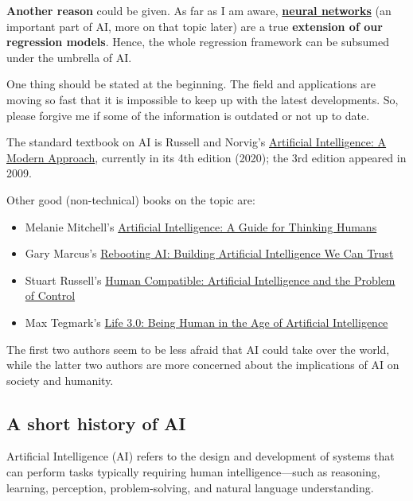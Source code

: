 \documentclass[
]{book}
\providecommand{\tightlist}{%
  \setlength{\itemsep}{0pt}\setlength{\parskip}{0pt}}
\begin{document}
\textbf{Another reason} could be given. As far as I am aware,
\href{https://en.wikipedia.org/wiki/Neural_network_(machine_learning)}{\textbf{neural networks}}
(an important part of AI, more on that topic later) are a
true \textbf{extension of our regression models}.
Hence, the whole regression framework
can be subsumed under the umbrella of AI.

One thing should be stated at the beginning. The field and applications are moving
so fast that it is impossible to keep up with the latest developments.
So, please forgive me if some of the information is outdated or not up to date.

The standard textbook on AI is Russell and Norvig's
\href{https://aima.cs.berkeley.edu/}{Artificial Intelligence: A Modern Approach},
currently in its 4th edition (2020); the 3rd edition appeared in 2009.

Other good (non-technical) books on the topic are:

\begin{itemize}
\tightlist
\item
  Melanie Mitchell's \href{https://melaniemitchell.me/aibook/}{Artificial Intelligence: A Guide for Thinking Humans}
\item
  Gary Marcus's \href{Rebooting\%20Ai:\%20Building\%20Artificial\%20Intelligence\%20We\%20Can\%20Trust}{Rebooting AI: Building Artificial Intelligence We Can Trust}
\item
  Stuart Russell's \href{https://en.wikipedia.org/wiki/Human_Compatible}{Human Compatible: Artificial Intelligence and the Problem of Control}
\item
  Max Tegmark's \href{https://en.wikipedia.org/wiki/Life_3.0}{Life 3.0: Being Human in the Age of Artificial Intelligence}
\end{itemize}

The first two authors seem to be less afraid that AI could take over the world,
while the latter two authors are more concerned about the implications of AI on society and humanity.

\subsection{A short history of AI}\label{a-short-history-of-ai}

Artificial Intelligence (AI) refers to the design and development of systems
that can perform tasks typically requiring human intelligence---such as reasoning,
learning, perception, problem-solving, and natural language understanding.
\end{document}
